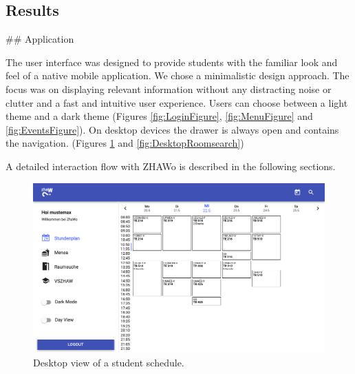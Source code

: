 \begin{markdown}
\section{Results} \label{results}

## Application

The user interface was designed to provide students with the familiar look and feel of a native mobile application. We chose a minimalistic design approach. The focus was on displaying relevant information without any distracting noise or clutter and a fast and intuitive user experience. Users can choose between a light theme and a dark theme (Figures \ref{fig:LoginFigure}, \ref{fig:MenuFigure} and \ref{fig:EventsFigure}).
On desktop devices the drawer is always open and contains the navigation. (Figures \ref{fig:DesktopSchedule} and \ref{fig:DesktopRoomsearch})

A detailed interaction flow with ZHAWo is described in the following sections.
\begin{figure}[H]
  \includegraphics[width=13.5cm, center]{./figures/desktop_schedule.png}
  \captionsetup{width=15.5cm}
  \caption[Desktop Schedule]{Desktop view of a student schedule.}
  \label{fig:DesktopSchedule}
\end{figure}

\vspace{-3ex} %


\end{markdown}
